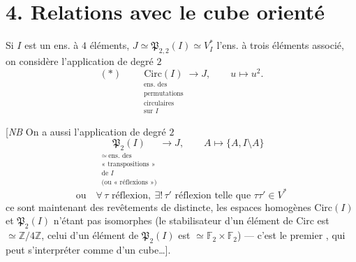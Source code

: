 \documentclass[11pt,a4paper]{article}
\begin{document}
\section{4. Relations avec le cube orienté}

Si $I$ est un ens. à $4$ éléments, $J \simeq \mathfrak{P}_{2,2}(I) \simeq V_I^*$ l'ens. à trois éléments associé, on considère l'application de degré $2$
\[
  (*) \qquad
  \underset{\substack{\text{ens. des}\\ \text{permutations}\\ \text{circulaires}\\ \text{sur } I}}{\mathrm{Circ}(I)} \longrightarrow J, \qquad u \longmapsto u^2 .
\]

[\emph{NB} \struck{\ill{}} On a aussi l'application de degré $2$
\[
  \underset{\substack{\simeq\ \text{ens. des}\\ \text{« transpositions »}\\ \text{de } I\\ \text{(ou « réflexions »)}}}{\mathfrak{P}_2(I)} \longrightarrow J,
  \qquad A \longmapsto \{A, I \setminus A\}
\]
\[
  \text{ou}\quad \forall\, \tau \text{ réflexion}, \ \exists!\, \tau' \text{ réflexion telle que } \tau\tau' \in V^*
\]
ce sont maintenant des revêtements de  distincte, les espaces homogènes  $\mathrm{Circ}(I)$ et $\mathfrak{P}_2(I)$ n'étant pas isomorphes (le stabilisateur d'un élément de $\mathrm{Circ}$ est $\simeq \mathbb{Z}/4\mathbb{Z}$, celui d'un élément de $\mathfrak{P}_2(I)$ est $\simeq \mathbb{F}_2 \times \mathbb{F}_2$) --- c'est le premier , qui peut s'interpréter comme   \ill{} \ill{} d'un cube\ldots].
\end{document}
